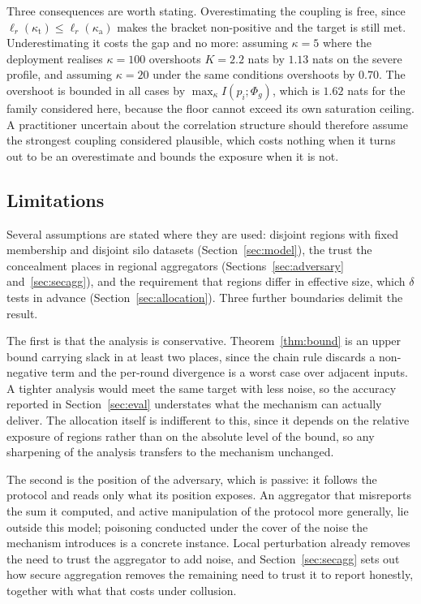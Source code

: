 \documentclass[acmsmall,screen,review,anonymous]{acmart}
\theoremstyle{acmdefinition}%
\begin{document}
Three consequences are worth stating. Overestimating the coupling is free, since
$\ell_r(\kappa_{\mathrm{t}}) \le \ell_r(\kappa_{\mathrm{a}})$ makes the bracket
non-positive and the target is still met. Underestimating it costs the gap and no
more: assuming $\kappa = 5$ where the deployment realises $\kappa = 100$
overshoots $K = 2.2$ nats by $1.13$ nats on the severe profile, and assuming
$\kappa = 20$ under the same conditions overshoots by $0.70$. The overshoot is
bounded in all cases by $\max_\kappa I(p_i;\Phi_g)$, which is $1.62$ nats for the
family considered here, because the floor cannot exceed its own saturation
ceiling. A practitioner uncertain about the correlation structure should
therefore assume the strongest coupling considered plausible, which costs nothing
when it turns out to be an overestimate and bounds the exposure when it is not.

\subsection{Limitations}
\label{sec:limitations}

Several assumptions are stated where they are used: disjoint regions with fixed
membership and disjoint silo datasets (Section~\ref{sec:model}), the trust the
concealment places in regional aggregators (Sections~\ref{sec:adversary}
and~\ref{sec:secagg}), and the requirement that regions differ in effective size,
which $\delta$ tests in advance (Section~\ref{sec:allocation}). Three further
boundaries delimit the result.

The first is that the analysis is conservative. Theorem~\ref{thm:bound} is an
upper bound carrying slack in at least two places, since the chain rule discards a
non-negative term and the per-round divergence is a worst case over adjacent
inputs. A tighter analysis would meet the same target with less noise, so the
accuracy reported in Section~\ref{sec:eval} understates what the mechanism can
actually deliver. The allocation itself is indifferent to this, since it depends
on the relative exposure of regions rather than on the absolute level of the
bound, so any sharpening of the analysis transfers to the mechanism unchanged.

The second is the position of the adversary, which is passive: it follows the
protocol and reads only what its position exposes. An aggregator that misreports
the sum it computed, and active manipulation of the protocol more generally, lie
outside this model; poisoning conducted under the cover of the noise the
mechanism introduces \cite{zheng2025dppoison} is a concrete instance. Local
perturbation already removes the need to trust the aggregator to add noise, and
Section~\ref{sec:secagg} sets out how secure aggregation removes the remaining
need to trust it to report honestly, together with what that costs under
collusion.
\end{document}
